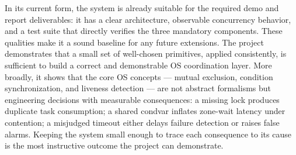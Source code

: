 \documentclass[11pt]{article}
\begin{document}
In its current form, the system is already suitable for the required demo and report deliverables: it has a clear architecture, observable concurrency behavior, and a test suite that directly verifies the three mandatory components. These qualities make it a sound baseline for any future extensions. The project demonstrates that a small set of well-chosen primitives, applied consistently, is sufficient to build a correct and demonstrable OS coordination layer. More broadly, it shows that the core OS concepts --- mutual exclusion, condition synchronization, and liveness detection --- are not abstract formalisms but engineering decisions with measurable consequences: a missing lock produces duplicate task consumption; a shared condvar inflates zone-wait latency under contention; a misjudged timeout either delays failure detection or raises false alarms. Keeping the system small enough to trace each consequence to its cause is the most instructive outcome the project can demonstrate.
\end{document}
